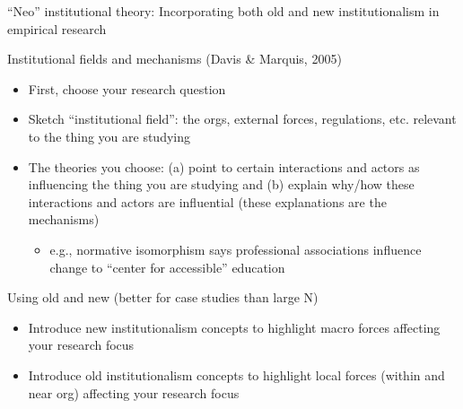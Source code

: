 \begin{frame}{``Neo'' institutional theory: Incorporating both old and new institutionalism in empirical research}

	Institutional fields and mechanisms (Davis \& Marquis, 2005)
	\begin{itemize}
		\item First, choose your research question
		\item Sketch ``institutional field'': the orgs, external forces, regulations, etc. relevant to the thing you are studying
		\item The theories you choose: (a) point to certain interactions and actors as influencing the thing you are studying and  (b) explain why/how these interactions and actors are influential (these explanations are the mechanisms)
		\begin{itemize}
			\item e.g., normative isomorphism says professional associations influence change to ``center for accessible'' education
		\end{itemize}
		
	\end{itemize}	
	\vspace{2mm}
	Using old and new (better for case studies than large N)
	\begin{itemize}
		\item Introduce new institutionalism concepts to highlight macro forces affecting your research focus
		\item Introduce old institutionalism concepts to highlight local forces (within and near org) affecting your research focus
	\end{itemize}
\end{frame}

